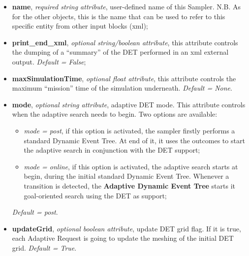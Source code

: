 \begin{itemize}
  \itemsep0em
  \item \textbf{name}, \textit{required string attribute}, user-defined name of this Sampler. N.B. As for the other objects, this is the name that can be used to refer to this specific entity from other input blocks (xml);
  \item \textbf{print\_end\_xml}, \textit{optional string/boolean attribute}, this attribute controls the dumping of a ``summary'' of the DET performed in an xml external output. \textit{Default = False};
  \item \textbf{maxSimulationTime}, \textit{optional float attribute}, this attribute controls the maximum ``mission'' time of the simulation underneath. \textit{Default = None}.
  \item \textbf{mode}, \textit{optional string attribute}, adaptive DET mode. This attribute controls when the adaptive search needs to begin. Two options are available:
      \begin{itemize}
         \item \textit{mode = post}, if this option is activated, the sampler firstly performs a standard Dynamic Event Tree. At end of it, it uses the outcomes to start the adaptive search in conjunction with the DET support;
         \item \textit{mode = online},  if this option is activated, the adaptive search starts at begin, during the initial standard Dynamic Event Tree. Whenever a transition is detected, the \textbf{Adaptive Dynamic Event Tree} starts it goal-oriented search using the DET as support;
      \end{itemize}
      \textit{Default = post}.
  \item \textbf{updateGrid}, \textit{optional boolean attribute}, update DET grid flag. If it is true, each Adaptive Request is going to update the meshing of the initial DET grid.  \textit{Default = True}.
\end{itemize}
